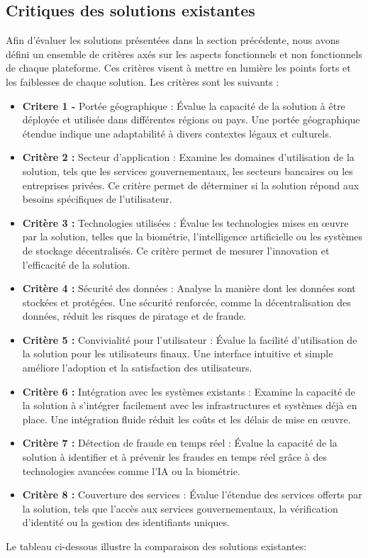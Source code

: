 \subsection{Critiques des solutions existantes}
Afin d'évaluer les solutions présentées dans la section précédente, nous avons défini un ensemble de critères axés sur les aspects fonctionnels et non fonctionnels de chaque plateforme. Ces critères visent à mettre en lumière les points forts et les faiblesses de chaque solution. Les critères sont les suivants :
\begin{itemize}[label=\textbullet]

\item \textbf{Critere 1 -} Portée géographique  :  Évalue la capacité de la solution à être déployée et utilisée dans différentes régions ou pays. Une portée géographique étendue indique une adaptabilité à divers contextes légaux et culturels.


\item \textbf{ Critère 2 :  }  Secteur d'application :  Examine les domaines d'utilisation de la solution, tels que les services gouvernementaux, les secteurs bancaires ou les entreprises privées. Ce critère permet de déterminer si la solution répond aux besoins spécifiques de l'utilisateur.

\item \textbf{ Critère 3 :  }  Technologies utilisées :  Évalue les technologies mises en œuvre par la solution, telles que la biométrie, l'intelligence artificielle ou les systèmes de stockage décentralisés. Ce critère permet de mesurer l'innovation et l'efficacité de la solution.

\item \textbf{ Critère 4 :  }  Sécurité des données :  Analyse la manière dont les données sont stockées et protégées. Une sécurité renforcée, comme la décentralisation des données, réduit les risques de piratage et de fraude.

\item \textbf{ Critère 5 :  }  Convivialité pour l'utilisateur :  Évalue la facilité d'utilisation de la solution pour les utilisateurs finaux. Une interface intuitive et simple améliore l'adoption et la satisfaction des utilisateurs.

\item \textbf{ Critère 6 :  }  Intégration avec les systèmes existants :  Examine la capacité de la solution à s'intégrer facilement avec les infrastructures et systèmes déjà en place. Une intégration fluide réduit les coûts et les délais de mise en œuvre.

\item \textbf{ Critère 7 :  }  Détection de fraude en temps réel :  Évalue la capacité de la solution à identifier et à prévenir les fraudes en temps réel grâce à des technologies avancées comme l'IA ou la biométrie.

\item \textbf{ Critère 8 :  }  Couverture des services :  Évalue l'étendue des services offerts par la solution, tels que l'accès aux services gouvernementaux, la vérification d'identité ou la gestion des identifiants uniques.
   \end{itemize}
Le tableau ci-dessous illustre la comparaison des solutions existantes:

